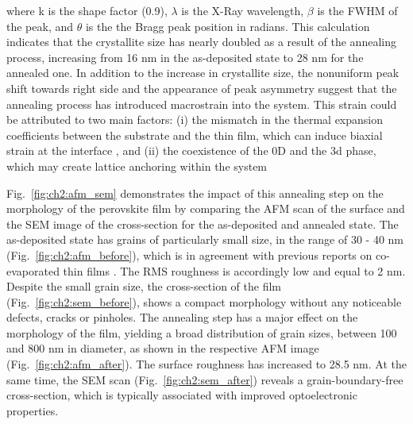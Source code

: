 where k is the shape factor (0.9), $\lambda$ is the X-Ray wavelength, $\beta$ is the FWHM of the peak, and $\theta$ is the the Bragg peak position in radians. This calculation indicates that the crystallite size has nearly doubled as a result of the annealing process, increasing from 16 nm in the as-deposited state to 28 nm for the annealed one. In addition to the increase in crystallite size, the nonuniform peak shift towards right side and the appearance of peak asymmetry suggest that the annealing process has introduced macrostrain into the system. This strain could be attributed to two main factors: (i) the mismatch in the thermal expansion coefficients between the substrate and the thin film, which can induce biaxial strain at the interface \cite{Steele2019ThermalFilms}, and (ii) the coexistence of the 0D  and the 3d  phase, which may create lattice anchoring within the system \cite{Steele2022AnFilms, Saha2024Oxygen-MediatedPerformance}



Fig.~\ref{fig:ch2:afm_sem} demonstrates the impact of this annealing step on the morphology of the perovskite film by comparing the AFM scan of the surface and the SEM image of the cross-section for the as-deposited and annealed state. The as-deposited state has grains of particularly small size, in the range of 30 - 40 nm (Fig.~\ref{fig:ch2:afm_before}), which is in agreement with previous reports on co-evaporated  thin films \cite{Frolova2017HighlyPbIsub2/sub, Zhang2023SemitransparentAbsorber}. The RMS roughness is accordingly low and equal to 2 nm. Despite the small grain size, the cross-section of the film (Fig.~\ref{fig:ch2:sem_before}), shows a compact morphology without any noticeable defects, cracks or pinholes. The annealing step has a major effect on the morphology of the film, yielding a broad distribution of grain sizes, between 100 and 800 nm in diameter, as shown in the respective AFM image (Fig.~\ref{fig:ch2:afm_after}). The surface roughness has increased to 28.5 nm. At the same time, the SEM scan (Fig.~\ref{fig:ch2:sem_after}) reveals a grain-boundary-free cross-section, which is typically associated with improved optoelectronic properties. 


